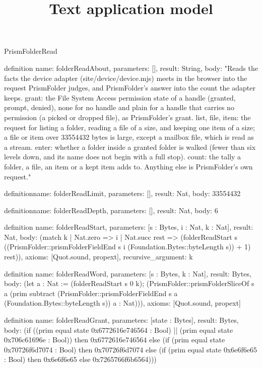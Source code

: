 \begin{lexlean}{PrismFolderRead}
\title{Text application model}
\begin{semanticmodule}
definition{
  name: folderReadAbout,
  parameters: [],
  result: String,
  body: "Reads the facts the device adapter (site/device/device.mjs) meets in the browser into the request PrismFolder judges, and PrismFolder's answer into the count the adapter keeps. grant: the File System Access permission state of a handle (granted, prompt, denied), none for no handle and plain for a handle that carries no permission (a picked or dropped file), as PrismFolder's grant. list, file, item: the request for listing a folder, reading a file of a size, and keeping one item of a size; a file or item over 33554432 bytes is large, except a mailbox file, which is read as a stream. enter: whether a folder inside a granted folder is walked (fewer than six levels down, and its name does not begin with a full stop). count: the tally a folder, a file, an item or a kept item adds to. Anything else is PrismFolder's own request."
}

definition{name: folderReadLimit, parameters: [], result: Nat, body: 33554432}

definition{name: folderReadDepth, parameters: [], result: Nat, body: 6}

definition{
  name: folderReadStart,
  parameters: [s : Bytes, i : Nat, k : Nat],
  result: Nat,
  body: (match k
    | Nat.zero => i
    | Nat.succ rest => (folderReadStart s ((PrismFolder::prismFolderFieldEnd s i (Foundation.Bytes::byteLength s)) + 1) rest)),
  axioms: [Quot.sound, propext],
  recursive_argument: k
}

definition{
  name: folderReadWord,
  parameters: [s : Bytes, k : Nat],
  result: Bytes,
  body: (let a : Nat := (folderReadStart s 0 k); (PrismFolder::prismFolderSliceOf s a (prim subtract (PrismFolder::prismFolderFieldEnd s a (Foundation.Bytes::byteLength s)) a : Nat))),
  axioms: [Quot.sound, propext]
}

definition{
  name: folderReadGrant,
  parameters: [state : Bytes],
  result: Bytes,
  body: (if ((prim equal state 0x6772616e746564 : Bool) || (prim equal state 0x706c61696e : Bool)) then 0x6772616e746564 else (if (prim equal state 0x70726f6d7074 : Bool) then 0x70726f6d7074 else (if (prim equal state 0x6e6f6e65 : Bool) then 0x6e6f6e65 else 0x7265766f6b6564)))
}


\end{semanticmodule}
\end{lexlean}
